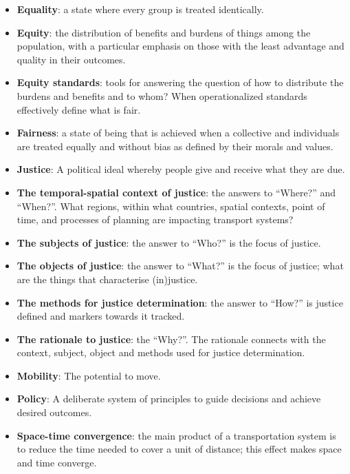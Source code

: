 \documentclass[12pt, oneside]{report}
\providecommand{\tightlist}{%
  \setlength{\itemsep}{0pt}\setlength{\parskip}{0pt}}\usepackage{longtable,booktabs,array}
\begin{document}
\begin{itemize}
\item
  \textbf{Equality}: a state where every group is treated identically.
\item
  \textbf{Equity}: the distribution of benefits and burdens of things
  among the population, with a particular emphasis on those with the
  least advantage and quality in their outcomes.
\item
  \textbf{Equity standards}: tools for answering the question of how to
  distribute the burdens and benefits and to whom? When operationalized
  standards effectively define what is fair.
\item
  \textbf{Fairness}: a state of being that is achieved when a collective
  and individuals are treated equally and without bias as defined by
  their morals and values.
\item
  \textbf{Justice}: A political ideal whereby people give and receive
  what they are due.
\item
  \textbf{The temporal-spatial context of justice}: the answers to
  ``Where?'' and ``When?''. What regions, within what countries, spatial
  contexts, point of time, and processes of planning are impacting
  transport systems?
\item
  \textbf{The subjects of justice}: the answer to ``Who?'' is the focus
  of justice.
\item
  \textbf{The objects of justice}: the answer to ``What?'' is the focus
  of justice; what are the things that characterise (in)justice.
\item
  \textbf{The methods for justice determination}: the answer to ``How?''
  is justice defined and markers towards it tracked.
\item
  \textbf{The rationale to justice}: the ``Why?''. The rationale
  connects with the context, subject, object and methods used for
  justice determination.
\item
  \textbf{Mobility}: The potential to move.
\item
  \textbf{Policy}: A deliberate system of principles to guide decisions
  and achieve desired outcomes.
\end{itemize}

\begin{itemize}
\tightlist
\item
  \textbf{Space-time convergence}: the main product of a transportation
  system is to reduce the time needed to cover a unit of distance; this
  effect makes space and time converge.
\end{itemize}
\end{document}
